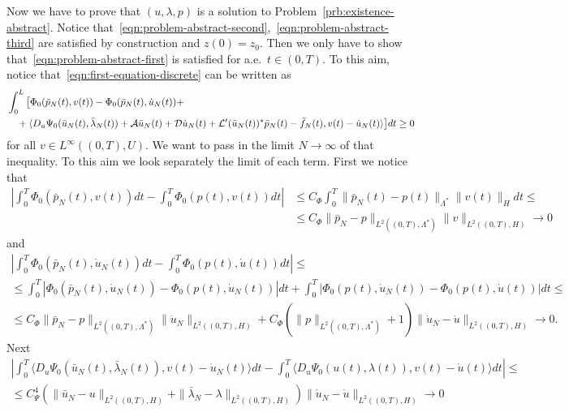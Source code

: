 \documentclass[a4paper,10pt,twoside]{amsbook}
\numberwithin{section}{chapter}
\numberwithin{equation}{chapter}
\theoremstyle{definition}
\DeclarePairedDelimiter{\dual}{\langle}{\rangle}
\begin{document}
Now we have to prove that $(u,\lambda,p)$ is a solution to Problem~\ref{prb:existence-abstract}. Notice that~\eqref{eqn:problem-abstract-second},~\eqref{eqn:problem-abstract-third} are satisfied by construction and $z(0)=z_0$. Then we only have to show that~\eqref{eqn:problem-abstract-first} is satisfied for a.e.\ $t\in(0,T)$. To this aim, notice that~\eqref{eqn:first-equation-discrete} can be written as
\begin{equation}
\label{eqn:inclusion-bochner-discrete}
\begin{multlined}
\int_0^L\big[\Phi_0(\bar{p}_N(t),v(t))-\Phi_0(\bar{p}_N(t),\dot u_N(t))+\\
+\dual{D_u\Psi_0(\bar u_N(t),\bar\lambda_N(t))+\mathcal{A}\bar u_N(t)+\mathcal{D}\dot u_N(t)+\mathcal{L}'(\bar u_N(t))^*\bar p_N(t)-\bar f_N(t),v(t)-\dot u_N(t)}\big]dt\ge0
\end{multlined}
\end{equation}
for all $v\in L^\infty((0,T),U)$. We want to pass in the limit $N\to\infty$ of that inequality. To this aim we look separately the limit of each term. First we notice that
\[
\begin{split}
\left|\int_0^T\Phi_0(\bar{p}_N(t),v(t))dt-\int_0^T\Phi_0(p(t),v(t))dt\right|
&\le C_\Phi\int_0^T\|\bar{p}_N(t)-p(t)\|_{\Lambda^*}\|v(t)\|_Hdt\le\\
&\le C_\Phi\|\bar{p}_N-p\|_{L^2((0,T),\Lambda^*)}\|v\|_{L^2((0,T),H)}\to0
\end{split}
\]
and
\[
\begin{multlined}
\left|\int_0^T\Phi_0(\bar{p}_N(t),\dot{u}_N(t))dt-\int_0^T\Phi_0(p(t),\dot{u}(t))dt\right|\le\\
\le\int_0^T\left|\Phi_0(\bar{p}_N(t),\dot{u}_N(t))-\Phi_0(p(t),\dot{u}_N(t))\right|dt+\int_0^T\left|\Phi_0(p(t),\dot{u}_N(t))-\Phi_0(p(t),\dot{u}(t))\right|dt\le\\
\le C_\Phi\|\bar{p}_N-p\|_{L^2((0,T),\Lambda^*)}\|\dot{u}_N\|_{L^2((0,T),H)}+C_\Phi(\|p\|_{L^2((0,T),\Lambda^*)}+1)\|\dot{u}_N-\dot{u}\|_{L^2((0,T),H)}\to0.
\end{multlined}
\]
Next
\[
\begin{multlined}
\left|\int_0^T\langle D_u\Psi_0(\bar{u}_N(t),\bar{\lambda}_N(t)),v(t)-\dot{u}_N(t)\rangle dt-\int_0^T\langle D_u\Psi_0(u(t),\lambda(t)),v(t)-\dot{u}(t)\rangle dt\right|\le\\
\le C_\Psi^4\left(\|\bar{u}_N-u\|_{L^2((0,T),H)}+\|\bar{\lambda}_N-\lambda\|_{L^2((0,T),H)}\right)\|\dot{u}_N-\dot{u}\|_{L^2((0,T),H)}\to0
\end{multlined}
\]
\end{document}
